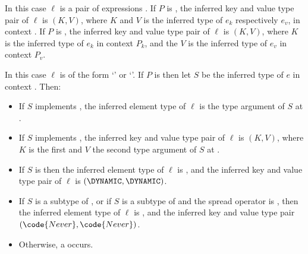 \documentclass[makeidx]{article}
\begin{document}
{\LMHash{}%
In this case $\ell$ is a pair of expressions .
%
If $P$ is \FreeContext,
the inferred key and value type pair of $\ell$ is $(K, V)$,
where $K$ and $V$ is
the inferred type of $e_k$ respectively $e_v$,
in context \FreeContext.
%
If $P$ is ,
the inferred key and value type pair of $\ell$ is $(K, V)$,
where $K$ is
the inferred type of $e_k$ in context $P_k$, and
the $V$ is
the inferred type of $e_v$ in context $P_v$.
\EndCase

\LMHash{}%
%
In this case $\ell$ is of the form
`' or `'.
If $P$ is \FreeContext{} then let $S$ be
the inferred type of $e$ in context \FreeContext.
Then:

\begin{itemize}
\item
  If $S$ implements ,
  the inferred element type of $\ell$ is
  the type argument of $S$ at .

\item
  If $S$ implements ,
  the inferred key and value type pair of $\ell$ is $(K, V)$,
  where $K$ is the first and $V$ the second type argument
  of $S$ at .

\item
  If $S$ is \DYNAMIC{} then
  the inferred element type of $\ell$ is \DYNAMIC,
  and the inferred key and value type pair of $\ell$ is
  $(\DYNAMIC, \DYNAMIC)$.

\item
  If $S$ is a subtype of ,
  or if $S$ is a subtype of  and the spread operator is ,
  then the inferred element type of $\ell$ is ,
  and the inferred key and value type pair $(\code{Never}, \code{Never})$.
\item
  Otherwise, a  occurs.
\end{itemize}

}
\end{document}
